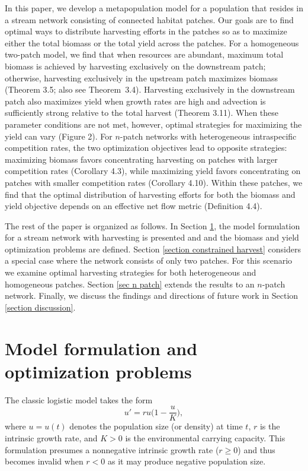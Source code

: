 \documentclass[11pt]{article}
\theoremstyle{definition}
\begin{document}
In this paper, we develop a metapopulation model for a population that resides in a stream network consisting of connected habitat patches. 
Our goals are to find optimal ways to distribute harvesting efforts in the patches so as to maximize either the total biomass or the total yield across the patches.  For a homogeneous two-patch model, we find that when resources are abundant, maximum total biomass is achieved by harvesting exclusively on the downstream patch; otherwise, harvesting exclusively in the upstream patch maximizes biomass (Theorem 3.5; also see Theorem~3.4). Harvesting exclusively in the downstream patch also maximizes yield when growth rates are high and advection is sufficiently strong relative to the total harvest (Theorem 3.11). When these parameter conditions are not met, however, optimal strategies for maximizing the yield can vary (Figure 2). For $n$-patch networks with heterogeneous intraspecific competition rates, the two optimization objectives lead to opposite strategies: maximizing biomass favors concentrating harvesting on patches with larger competition rates (Corollary 4.3), while maximizing yield favors concentrating on patches with smaller competition rates (Corollary 4.10). Within these patches, we find that the optimal distribution of harvesting efforts for both the biomass and yield objective depends on an effective net flow metric (Definition 4.4).

The rest of the paper is organized as follows. In Section \ref{section model}, the model formulation for a stream network with harvesting is presented and and the biomass and yield optimization problems are defined. Section \ref{section constrained harvest} considers a special case where the network consists of only two patches. For this scenario we examine optimal harvesting strategies for both heterogeneous and homogeneous patches. Section \ref{sec n patch} extends the results to an $n$-patch network. Finally, we discuss the findings and directions of future work in Section \ref{section discussion}.



\section{Model formulation and optimization problems}\label{section model}
The classic logistic model takes the form  \begin{equation}\label{eq-logistic}
    u'=ru\Big(1-\frac{u}{K}\Big),
\end{equation}
where $u=u(t)$ denotes the population size (or density) at time $t$, $r$ is the intrinsic growth rate, and $K>0$ is the environmental carrying capacity. This formulation presumes a nonnegative intrinsic growth rate ($r\ge 0$) and thus becomes invalid when $r<0$ as it may produce negative population size. 
\end{document}
